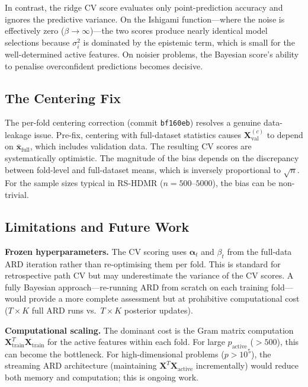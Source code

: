 \documentclass[11pt,a4paper]{article}
\begin{document}
In contrast, the ridge CV score evaluates only point-prediction accuracy and ignores the predictive variance. On the Ishigami function---where the noise is effectively zero ($\beta \to \infty$)---the two scores produce nearly identical model selections because $\sigma_i^2$ is dominated by the epistemic term, which is small for the well-determined active features. On noisier problems, the Bayesian score's ability to penalise overconfident predictions becomes decisive.

\subsection{The Centering Fix}

The per-fold centering correction (commit \texttt{bf160eb}) resolves a genuine data-leakage issue. Pre-fix, centering with full-dataset statistics causes $\mathbf{X}_{\text{val}}^{(c)}$ to depend on $\bar{\mathbf{x}}_{\text{full}}$, which includes validation data. The resulting CV scores are systematically optimistic. The magnitude of the bias depends on the discrepancy between fold-level and full-dataset means, which is inversely proportional to $\sqrt{n}$. For the sample sizes typical in RS-HDMR ($n = 500$--$5000$), the bias can be non-trivial.

\subsection{Limitations and Future Work}

\textbf{Frozen hyperparameters.} The CV scoring uses $\boldsymbol{\alpha}_t$ and $\beta_t$ from the full-data ARD iteration rather than re-optimising them per fold. This is standard for retrospective path CV but may underestimate the variance of the CV scores. A fully Bayesian approach---re-running ARD from scratch on each training fold---would provide a more complete assessment but at prohibitive computational cost ($T \times K$ full ARD runs vs.\ $T \times K$ posterior updates).

\textbf{Computational scaling.} The dominant cost is the Gram matrix computation $\mathbf{X}_{\text{train}}^T \mathbf{X}_{\text{train}}$ for the active features within each fold. For large $p_{\text{active}}$ ($>500$), this can become the bottleneck. For high-dimensional problems ($p > 10^5$), the streaming ARD architecture (maintaining $\mathbf{X}^T\mathbf{X}_{\text{active}}$ incrementally) would reduce both memory and computation; this is ongoing work.
\end{document}
